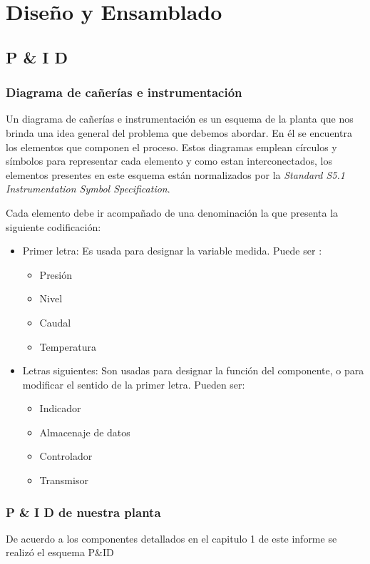 \chapter{Diseño y Ensamblado}
\label{ch:DisenoEnsamblado}

\section{P \& I D}
\label{sec:p&id}

\subsection{Diagrama de cañerías e instrumentación}
Un diagrama de cañerías e instrumentación es un esquema de la planta que nos brinda una idea 
general del problema que debemos abordar. En él se encuentra los elementos que componen el proceso. 
Estos diagramas emplean círculos y símbolos para representar cada elemento y como estan interconectados, 
los elementos presentes en este esquema están normalizados por la \emph{Standard S5.1
Instrumentation Symbol Specification}.

Cada elemento debe ir acompañado de una denominación la que presenta la siguiente codificación:


\begin{itemize}  
 \item Primer letra: 
 Es usada para designar la variable medida. Puede ser :
 \begin{itemize}
  \item Presión
  \item Nivel
  \item Caudal
  \item Temperatura
 \end{itemize}

 \item Letras siguientes:
 Son usadas para designar la función del componente, o para modificar el sentido de la primer letra.
 Pueden ser:
 \begin{itemize}
  \item Indicador
  \item Almacenaje de datos
  \item Controlador
  \item Transmisor
 \end{itemize}
\end{itemize}

\subsection{P \& I D de nuestra planta}
De acuerdo a los componentes detallados en el capitulo 1 de este informe se realizó el esquema P&ID


